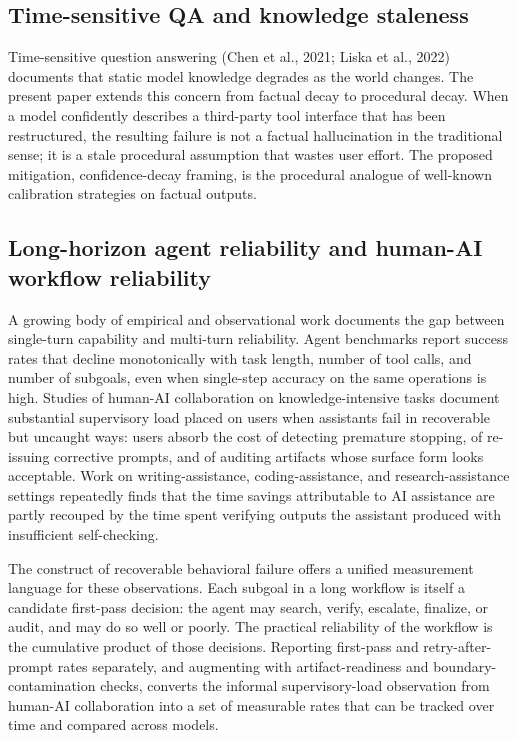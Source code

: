 \documentclass[11pt]{article}
\begin{document}
\subsection{Time-sensitive QA and knowledge staleness}
Time-sensitive question answering (Chen et al., 2021; Liska et al., 2022) documents that static model knowledge degrades as the world changes. The present paper extends this concern from factual decay to procedural decay. When a model confidently describes a third-party tool interface that has been restructured, the resulting failure is not a factual hallucination in the traditional sense; it is a stale procedural assumption that wastes user effort. The proposed mitigation, confidence-decay framing, is the procedural analogue of well-known calibration strategies on factual outputs.

\subsection{Long-horizon agent reliability and human-AI workflow reliability}
A growing body of empirical and observational work documents the gap between single-turn capability and multi-turn reliability. Agent benchmarks report success rates that decline monotonically with task length, number of tool calls, and number of subgoals, even when single-step accuracy on the same operations is high. Studies of human-AI collaboration on knowledge-intensive tasks document substantial supervisory load placed on users when assistants fail in recoverable but uncaught ways: users absorb the cost of detecting premature stopping, of re-issuing corrective prompts, and of auditing artifacts whose surface form looks acceptable. Work on writing-assistance, coding-assistance, and research-assistance settings repeatedly finds that the time savings attributable to AI assistance are partly recouped by the time spent verifying outputs the assistant produced with insufficient self-checking.

The construct of recoverable behavioral failure offers a unified measurement language for these observations. Each subgoal in a long workflow is itself a candidate first-pass decision: the agent may search, verify, escalate, finalize, or audit, and may do so well or poorly. The practical reliability of the workflow is the cumulative product of those decisions. Reporting first-pass and retry-after-prompt rates separately, and augmenting with artifact-readiness and boundary-contamination checks, converts the informal supervisory-load observation from human-AI collaboration into a set of measurable rates that can be tracked over time and compared across models.
\end{document}
